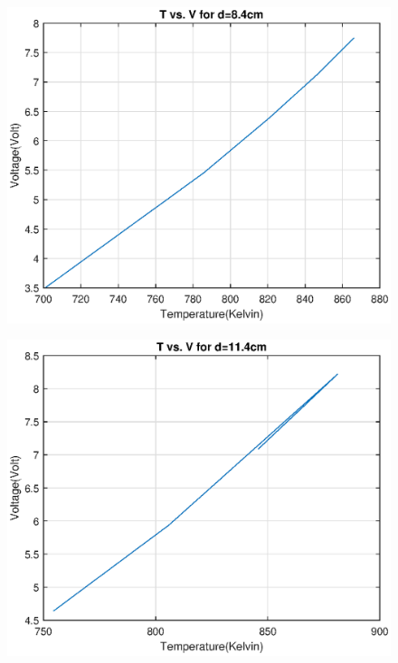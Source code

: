 \documentclass[10pt,a4paper]{article}
\begin{document}
{\begin{figure}[H]
\end{figure}
\begin{figure}[H]
	\advance{}
	\includegraphics[scale=0.7]{8notneeded.eps}
	
\end{figure}
\begin{figure}[H]
	\advance{}
	\includegraphics[scale=0.7]{11notneeded.eps}
	

\end{figure}}
\end{document}
